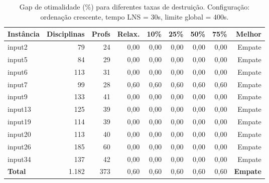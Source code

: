 \begin{table}[htbp]
\centering
\caption{Gap de otimalidade (\%) para diferentes taxas de destruição. Configuração: ordenação crescente, tempo LNS = 30s, limite global = 400s.}
\label{tab:lns_cand_gap}
\small
\begin{tabular}{@{}lrrrrrrrr@{}}
\toprule
\textbf{Instância} & \textbf{Disciplinas} & \textbf{Profs} & \textbf{Relax.} & \textbf{10\%} & \textbf{25\%} & \textbf{50\%} & \textbf{75\%} & \textbf{Melhor} \\
\midrule
input2  & 79  & 24 & 0,00 & 0,00 & 0,00 & 0,00 & 0,00 & Empate \\
input5  & 84  & 29 & 0,00 & 0,00 & 0,00 & 0,00 & 0,00 & Empate \\
input6  & 113 & 31 & 0,00 & 0,00 & 0,00 & 0,00 & 0,00 & Empate \\
input7  & 99  & 28 & 0,60 & 0,60 & 0,60 & 0,60 & 0,60 & Empate \\
input9  & 133 & 41 & 0,00 & 0,00 & 0,00 & 0,00 & 0,00 & Empate \\
input13 & 125 & 39 & 0,00 & 0,00 & 0,00 & 0,00 & 0,00 & Empate \\
input19 & 114 & 39 & 0,00 & 0,00 & 0,00 & 0,00 & 0,00 & Empate \\
input20 & 113 & 40 & 0,00 & 0,00 & 0,00 & 0,00 & 0,00 & Empate \\
input26 & 185 & 60 & 0,00 & 0,00 & 0,00 & 0,00 & 0,00 & Empate \\
input34 & 137 & 42 & 0,00 & 0,00 & 0,00 & 0,00 & 0,00 & Empate \\
\midrule
\textbf{Total}  & 1.182 & 373 & 0,60 & 0,60 & 0,60 & 0,60 & 0,60 & \textbf{Empate} \\
\bottomrule
\end{tabular}
\end{table}

